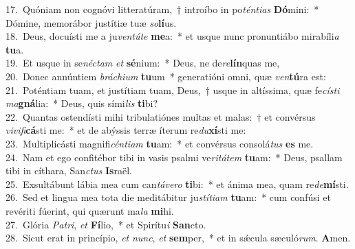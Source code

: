 {17.~}Quóniam non cognóvi litteratúram,~† introíbo in po\textit{tén}\textit{ti}\textit{as} \textbf{Dó}mini:~* Dómine, memorábor justítiæ tuæ \textit{so}\textbf{lí}us.\\
{18.~}Deus, docuísti me a ju\textit{ven}\textit{tú}\textit{te} \textbf{me}a:~* et usque nunc pronuntiábo mirabíli\textit{a} \textbf{tu}a.\\
{19.~}Et usque in se\textit{né}\textit{ctam} \textit{et} \textbf{sé}nium:~* Deus, ne de\textit{re}\textbf{lín}quas me,\\
{20.~}Donec annúntiem \textit{brá}\textit{chi}\textit{um} \textbf{tu}um~* generatióni omni, quæ \textit{ven}\textbf{tú}ra est:\\
{21.~}Poténtiam tuam, et justítiam tuam, Deus,~† usque in altíssima, quæ fe\textit{cí}\textit{sti} \textit{ma}\textbf{gná}lia:~* Deus, quis sími\textit{lis} \textbf{ti}bi?\\
{22.~}Quantas ostendísti mihi tribulatiónes multas et malas:~† et convérsus \textit{vi}\textit{vi}\textit{fi}\textbf{cá}sti me:~* et de abýssis terræ íterum re\textit{du}\textbf{xí}sti me:\\
{23.~}Multiplicásti magnifi\textit{cén}\textit{ti}\textit{am} \textbf{tu}am:~* et convérsus consolá\textit{tus} \textbf{es} me.\\
{24.~}Nam et ego confitébor tibi in vasis psalmi ve\textit{ri}\textit{tá}\textit{tem} \textbf{tu}am:~* Deus, psallam tibi in cíthara, San\textit{ctus} \textbf{Is}raël.\\
{25.~}Exsultábunt lábia mea cum can\textit{tá}\textit{ve}\textit{ro} \textbf{ti}bi:~* et ánima mea, quam re\textit{de}\textbf{mí}sti.\\
{26.~}Sed et lingua mea tota die meditábitur ju\textit{stí}\textit{ti}\textit{am} \textbf{tu}am:~* cum confúsi et revériti fúerint, qui quærunt ma\textit{la} \textbf{mi}hi.\\
{27.~}Glória \textit{Pa}\textit{tri}, \textit{et} \textbf{Fí}lio,~* et Spirítu\textit{i} \textbf{San}cto.\\
{28.~}Sicut erat in princípio, \textit{et} \textit{nunc}, \textit{et} \textbf{sem}per,~* et in sǽcula sæculó\textit{rum}. \textbf{A}men.\\
